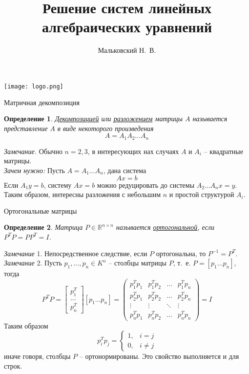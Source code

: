 \documentclass[10pt]{beamer}
\author{Мальковский Н.~В.}
\title[Решение СЛАУ]{Решение систем линейных алгебраических уравнений}
\institute[СПбАУ]{Санкт-Петербургский Академический  Университет}
\date{}
\newcounter{def}
\newtheorem{definition_ru}{Определение}[def]
\begin{document}
\begin{frame}
\titlepage
\centering
\texttt{[image: logo.png]}
\end{frame}

\begin{frame}{Матричная декомпозиция}
\begin{definition_ru}
\underline{Декомпозицией} или \underline{разложением} матрицы $A$ называется представление $A$ в виде некоторого произведения
$$
A=A_1A_2\ldots A_n
$$
\end{definition_ru}
\pause
\textit{Замечание.} Обычно $n=2, 3$, в интересующих нах случаях $A$ и $A_i$ -- квадратные матрицы.\\
\pause
\vspace{1em}
\textit{Зачем нужно:} Пусть $A=A_1\ldots A_n$, дана система
$$
Ax=b
$$ 
\pause
Если $A_1y=b$, систему $Ax=b$ можно редуцировать до системы $A_2\ldots A_nx=y$.\\
\pause
Таким образом, интересны разложения с небольшим $n$ и простой структурой $A_i$.
\end{frame}

\begin{frame}{Ортогональные матрицы}
\begin{definition_ru}
Матрица $P\in \mathbb{R}^{n\times n}$ называется \underline{ортогональной}, если $P^TP=PP^T=I$.
\end{definition_ru}
\pause
\textit{Замечание} 1. Непосредственное следствие, если $P$ ортогональна, то $P^{-1}=P^T$.
\pause 
\vspace{1em}
\textit{Замечание} 2. Пусть $p_1, \ldots, p_n\in K^n$ -- столбцы матрицы $P$, т.~е. $P=[p_1 \ldots p_n]$, тогда
$$
P^TP=\left[\begin{array}{c}
p_1^T\\ \ldots \\ p_n^T
\end{array}\right][p_1 \ldots p_n]=
\left(\begin{array}{cccc}
p_1^Tp_1 & p_1^Tp_2 & \ldots & p_1^Tp_n \\
p_2^Tp_1 & p_2^Tp_2 & \ldots & p_2^Tp_n \\
\vdots & \vdots & \ddots & \vdots \\
p_n^Tp_1 & p_n^Tp_2 & \ldots & p_n^Tp_n
\end{array}
\right)=I
$$
\pause
Таким образом 
$$
p_i^Tp_j=\begin{cases}
1, & i=j\\
0, & i\neq j
\end{cases}
$$
иначе говоря, столбцы $P$ -- ортонормированы. Это свойство выполняется и для строк.

\end{frame}
\end{document}
